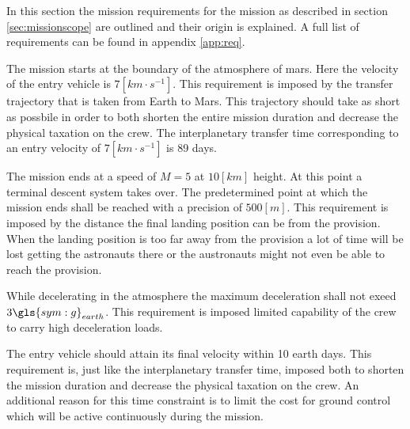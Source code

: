In this section the mission requirements for the mission as described in section \ref{sec:missionscope} are outlined and their origin is explained. A full list of requirements can be found in appendix \ref{app:req}.

The mission starts at the boundary of the atmosphere of mars. Here the velocity of the entry vehicle is $7 \left[km \cdot s^{-1} \right]$. This requirement is imposed by the transfer trajectory that is taken from Earth to Mars. This trajectory should take as short as possbile in order to both shorten the entire mission duration and decrease the physical taxation on the crew. The interplanetary transfer time corresponding to an entry velocity of $7 \left[km \cdot s^{-1} \right]$ is 89 days. 

The mission ends at a speed of $M=5$ at $10 \left[km\right]$ height. At this point a terminal descent system takes over. The predetermined point at which the mission ends shall be reached with a precision of $500 \left[m\right]$. This requirement is imposed by the distance the final landing position can be from the provision. When the landing position is too far away from the provision a lot of time will be lost getting the astronauts there or the austronauts might not even be able to reach the provision.

While decelerating in the atmosphere the maximum deceleration shall not exeed $3\gls{sym:g}_{earth}$. This requirement is imposed limited capability of the crew to carry high deceleration loads.

The entry vehicle should attain its final velocity within 10 earth days. This requirement is, just like the interplanetary transfer time, imposed both to shorten the mission duration and decrease the physical taxation on the crew. An additional reason for this time constraint is to limit the cost for ground control which will be active continuously during the mission.



